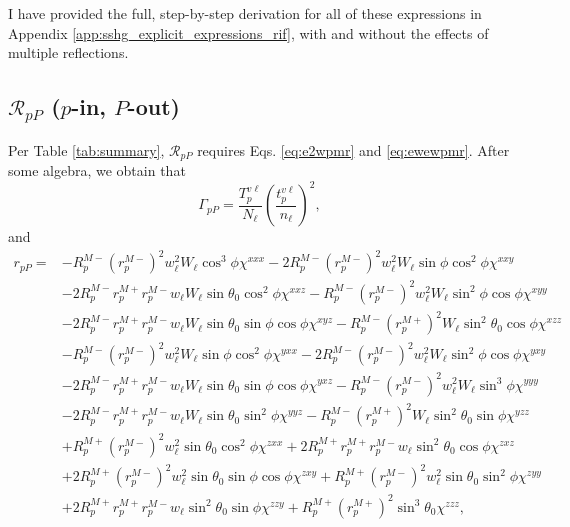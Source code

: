 I have provided the full, step-by-step derivation for all of these expressions
in Appendix \ref{app:sshg_explicit_expressions_rif}, with and without the
effects of multiple reflections.



\subsection{\texorpdfstring{$\mathcal{R}_{pP}$ ($p$-in, $P$-out)}
{RpP (p-in, P-out)}}
\label{sec:RpP} 

Per Table \ref{tab:summary}, $\mathcal{R}_{pP}$ requires Eqs. \eqref{eq:e2wpmr}
and \eqref{eq:ewewpmr}. After some algebra, we obtain that
\begin{equation}\label{eq:mc78}
\Gamma_{pP} =
\frac{T^{v\ell}_{p}}{N_{\ell}}
\left(\frac{t^{v\ell}_{p}}{n_{\ell}}\right)^{2}
,
\end{equation}
and
\begin{equation}
\begin{split}
r_{pP} =
&-R^{M-}_{p}\left(r^{M-}_{p}\right)^{2}w^{2}_{\ell}W_{\ell}\cos^{3}\phi
\chi^{xxx}
 -2R^{M-}_{p}\left(r^{M-}_{p}\right)^{2}w^{2}_{\ell}W_{\ell}\sin\phi\cos^{2}\phi
\chi^{xxy}\\
&-2R^{M-}_{p}r^{M+}_{p}r^{M-}_{p}w_{\ell}W_{\ell}\sin\theta_{0}\cos^{2}\phi
\chi^{xxz}
 -R^{M-}_{p}\left(r^{M-}_{p}\right)^{2}w^{2}_{\ell}W_{\ell}\sin^{2}\phi\cos\phi
\chi^{xyy}\\
&-2R^{M-}_{p}r^{M+}_{p}r^{M-}_{p}w_{\ell}W_{\ell}\sin\theta_{0}\sin\phi\cos\phi
\chi^{xyz}
 -R^{M-}_{p}\left(r^{M+}_{p}\right)^{2}W_{\ell}\sin^{2}\theta_{0}\cos\phi
\chi^{xzz}\\
&-R^{M-}_{p}\left(r^{M-}_{p}\right)^{2}w^{2}_{\ell}W_{\ell}\sin\phi\cos^{2}\phi
\chi^{yxx}
 -2R^{M-}_{p}\left(r^{M-}_{p}\right)^{2}w^{2}_{\ell}W_{\ell}\sin^{2}\phi\cos\phi
\chi^{yxy}\\
&-2R^{M-}_{p}r^{M+}_{p}r^{M-}_{p}w_{\ell}W_{\ell}\sin\theta_{0}\sin\phi\cos\phi
\chi^{yxz}
 -R^{M-}_{p}\left(r^{M-}_{p}\right)^{2}w^{2}_{\ell}W_{\ell}\sin^{3}\phi
\chi^{yyy}\\
&-2R^{M-}_{p}r^{M+}_{p}r^{M-}_{p}w_{\ell}W_{\ell}\sin\theta_{0}\sin^{2}\phi
\chi^{yyz}
 -R^{M-}_{p}\left(r^{M+}_{p}\right)^{2}W_{\ell}\sin^{2}\theta_{0}\sin\phi
\chi^{yzz}\\
&+R^{M+}_{p}\left(r^{M-}_{p}\right)^{2}w^{2}_{\ell}\sin\theta_{0}\cos^{2}\phi
\chi^{zxx}
 +2R^{M+}_{p}r^{M+}_{p}r^{M-}_{p}w_{\ell}\sin^{2}\theta_{0}\cos\phi
\chi^{zxz}\\
&+2R^{M+}_{p}\left(r^{M-}_{p}\right)^{2}w^{2}_{\ell}\sin\theta_{0}\sin\phi
\cos\phi\chi^{zxy}
 +R^{M+}_{p}\left(r^{M-}_{p}\right)^{2}w^{2}_{\ell}\sin\theta_{0}\sin^{2}\phi
\chi^{zyy}\\
&+2R^{M+}_{p}r^{M+}_{p}r^{M-}_{p}w_{\ell}\sin^{2}\theta_{0}\sin\phi
\chi^{zzy}
 +R^{M+}_{p}\left(r^{M+}_{p}\right)^{2}\sin^{3}\theta_{0}
\chi^{zzz},
\end{split}
\end{equation}
